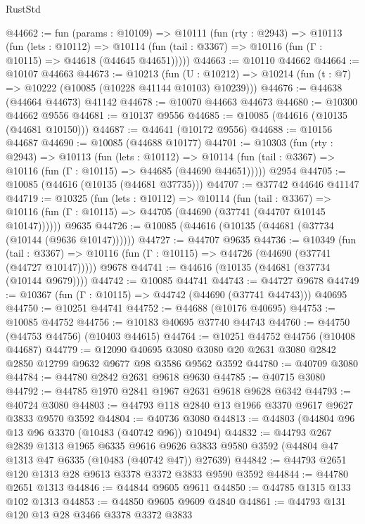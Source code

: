 \begin{lexlean}{RustStd}
\begin{coremodule}
@44662 := fun (params : @10109) =>
  @10111
    (fun (rty : @2943) =>
    @10113
      (fun (lets : @10112) =>
      @10114 (fun (tail : @3367) => @10116 (fun (Γ : @10115) => @44618 (@44645 @44651)))))
@44663 := @10110 @44662
@44664 := @10107 @44663
@44673 := @10213
    (fun (U : @10212) => @10214 (fun (t : @7) => @10222 (@10085 (@10228 @41144 @10103) @10239)))
@44676 := @44638 (@44664 @44673) @41142
@44678 := @10070 @44663 @44673
@44680 := @10300 @44662 @9556
@44681 := @10137 @9556
@44685 := @10085 (@44616 (@10135 (@44681 @10150)))
@44687 := @44641 (@10172 @9556)
@44688 := @10156 @44687
@44690 := @10085 (@44688 @10177)
@44701 := @10303
    (fun (rty : @2943) =>
    @10113
      (fun (lets : @10112) =>
      @10114 (fun (tail : @3367) => @10116 (fun (Γ : @10115) => @44685 (@44690 @44651)))))
    @2954
@44705 := @10085 (@44616 (@10135 (@44681 @37735)))
@44707 := @37742 @44646 @41147
@44719 := @10325
    (fun (lets : @10112) =>
    @10114
      (fun (tail : @3367) =>
      @10116 (fun (Γ : @10115) => @44705 (@44690 (@37741 (@44707 @10145 @10147))))))
    @9635
@44726 := @10085 (@44616 (@10135 (@44681 (@37734 (@10144 (@9636 @10147))))))
@44727 := @44707 @9635
@44736 := @10349
    (fun (tail : @3367) => @10116 (fun (Γ : @10115) => @44726 (@44690 (@37741 (@44727 @10147)))))
    @9678
@44741 := @44616 (@10135 (@44681 (@37734 (@10144 @9679))))
@44742 := @10085 @44741
@44743 := @44727 @9678
@44749 := @10367 (fun (Γ : @10115) => @44742 (@44690 (@37741 @44743))) @40695
@44750 := @10251 @44741
@44752 := @44688 (@10176 @40695)
@44753 := @10085 @44752
@44756 := @10183 @40695 @37740 @44743
@44760 := @44750 (@44753 @44756) (@10403 @44615)
@44764 := @10251 @44752 @44756 (@10408 @44687)
@44779 := @12090
    @40695
    @3080
    @3080
    @20
    @2631
    @3080
    @2842
    @2850
    @12799
    @9632
    @9677
    @98
    @3586
    @9562
    @3592
@44780 := @40709 @3080
@44784 := @44780 @2842 @2631 @9618 @9630
@44785 := @40715 @3080
@44792 := @44785 @1970 @2841 @1967 @2631 @9618 @9628 @6342
@44793 := @40724 @3080
@44803 := @44793 @118 @2840 @13 @1966 @3370 @9617 @9627 @3833 @9570 @3592
@44804 := @40736 @3080
@44813 := @44803 (@44804 @96 @13 @96 @3370 (@10483 (@40742 @96)) @10494)
@44832 := @44793
    @267
    @2839
    @1313
    @1965
    @6335
    @9616
    @9626
    @3833
    @9580
    @3592
    (@44804 @47 @1313 @47 @6335 (@10483 (@40742 @47)) @27639)
@44842 := @44793 @2651 @120 @1313 @28 @9613 @3378 @3372 @3833 @9590 @3592
@44844 := @44780 @2651 @1313
@44846 := @44844 @9605 @9611
@44850 := @44785 @1315 @133 @102 @1313
@44853 := @44850 @9605 @9609 @4840
@44861 := @44793 @131 @120 @13 @28 @3466 @3378 @3372 @3833

\end{coremodule}
\end{lexlean}
